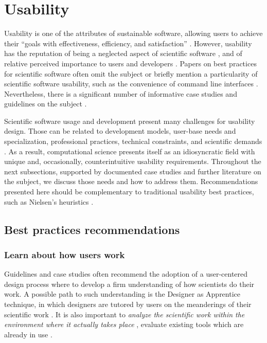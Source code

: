 \section{Usability}
\label{sec:usability}

Usability is one of the attributes of sustainable software, allowing users to achieve their “goals with effectiveness, efficiency, and satisfaction” \cite[p.3]{Venters_WSSSPE}. However, usability has the reputation of being a neglected aspect of scientific software \cite{Ahmed:2014}, and of relative perceived importance to users and developers \cite{Nguyen-Hoan:2010, Hucka:2016}. Papers on best practices for scientific software often omit the subject \cite{Stodden_WSSSPE, Wilson:2016} or briefly mention a particularity of scientific software usability, such as the convenience of command line interfaces \cite{bestprSC}. Nevertheless, there is a significant number of informative case studies and guidelines on the subject \cite{MacLeod:1992, Springmeyer:1993, Pancake:1996, Javahery:2004, Schraefel:2004,Letondal:2004, Talbott:2005, Macaulay:2009, DeRoure:2009, Keefe:2010, DeMatos:2013, Ahmed:2014, Beg:2016, List:2017}.

Scientific software usage and development present many challenges for usability design. Those can be related to development models, user-base needs and specialization, professional practices, technical constraints, and scientific demands \cite{Queiroz:2016}. As a result, computational science presents itself as an idiosyncratic field with unique and, occasionally, counterintuitive usability requirements. Throughout the next subsections, supported by documented case studies and further literature on the subject, we discuss those needs and how to address them. Recommendations presented here should be complementary to traditional usability best practices, such as Nielsen's heuristics \cite{Nielsen:1994}.

\subsection{Best practices recommendations}

\subsubsection{Learn about how users work}

Guidelines and case studies often recommend the adoption of a user-centered design process where to develop a firm understanding of how scientists do their work.  A possible path to such understanding is the Designer as Apprentice technique, in which designers are tutored by users on the meanderings of their scientific work \cite{Springmeyer:1993}.  It is also important to \emph{analyze the scientific work within the environment where it actually takes place} \cite{Pancake:1996}, evaluate existing tools which are already in use \cite{Javahery:2004}.  

